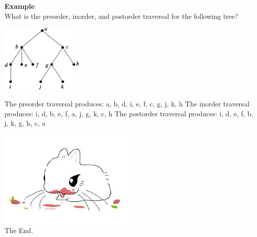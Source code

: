 \documentclass[12pt, letterpaper]{article}
\begin{document}
\textbf{Example} \\
What is the preorder, inorder, and postorder traversal for the following tree?
\begin{center}
	\includegraphics[width=0.3\textwidth]{travex.png}
\end{center}
The preorder traversal produces: a, b, d, i, e, f, c, g, j, k, h \smallbreak
The inorder traversal produces: i, d, b, e, f, a, j, g, k, c, h \smallbreak
The postorder traversal produces: i, d, e, f, b, j, k, g, h, c, a \smallbreak
\pagebreak

\begin{center}
	\includegraphics[width=0.5\textwidth]{the_end.jpg} \\
	{\LARGE The End.}
\end{center}
\end{document}
